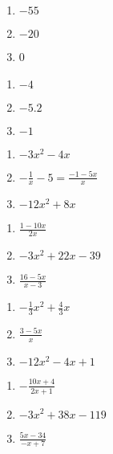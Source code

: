 \begin{multicols}{3}
\begin{enumerate}
	\item $-55$
	\item $-20$
	\item 0
\end{enumerate}	\setcounter{Review}{\value{enumi}}
\end{multicols}
\begin{multicols}{3}
\begin{enumerate}	\setcounter{enumi}{\value{Review}}
	\item $-4$
	\item $-5.2$
	\item $-1$
\end{enumerate}	\setcounter{Review}{\value{enumi}}
\end{multicols}
\begin{multicols}{3}
\begin{enumerate}	\setcounter{enumi}{\value{Review}}
	\item $-3x^2 - 4x$
	\item $-\frac{1}{x}-5 = \frac{-1-5x}{x}$
	\item $-12x^2 + 8x$
\end{enumerate}	\setcounter{Review}{\value{enumi}}
\end{multicols}
\begin{multicols}{3}
\begin{enumerate}	\setcounter{enumi}{\value{Review}}
	\item $\frac{1-10x}{2x}$
	\item $-3x^2 + 22x - 39$
	\item $\frac{16-5x}{x-3}$
\end{enumerate}	\setcounter{Review}{\value{enumi}}
\end{multicols}
\begin{multicols}{3}
\begin{enumerate}	\setcounter{enumi}{\value{Review}}
	\item $-\frac{1}{3}x^2 + \frac{4}{3}x$
	\item $\frac{3-5x}{x}$
	\item $-12x^2 - 4x + 1$
\end{enumerate}	\setcounter{Review}{\value{enumi}}
\end{multicols}
\begin{multicols}{3}
\begin{enumerate}	\setcounter{enumi}{\value{Review}}
	\item $-\frac{10x+4}{2x+1}$
	\item $-3x^2 + 38x - 119$
	\item $\frac{5x-34}{-x+7}$
\end{enumerate}
\end{multicols}

